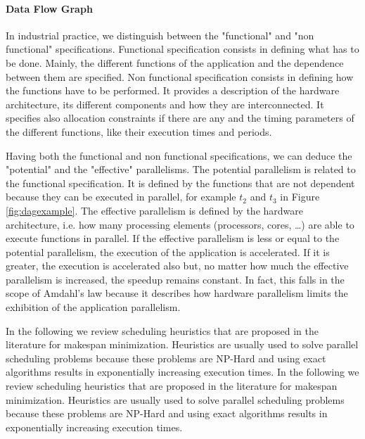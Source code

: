 \paragraph{Data Flow Graph}

In industrial practice, we distinguish between the "functional" and "non functional" specifications. Functional specification consists in defining what has to be done. Mainly, the different functions of the application and the dependence between them are specified. Non functional specification consists in defining how the functions have to be performed. It provides a description of the hardware architecture, its different components and how they are interconnected. It specifies also allocation constraints if there are any and the timing parameters of the different functions, like their execution times and periods.

Having both the functional and non functional specifications, we can deduce the "potential" and the "effective" parallelisms. The potential parallelism is related to the functional specification. It is defined by the functions that are not dependent because they can be executed in parallel, for example $t_2$ and $t_3$ in Figure \ref{fig:dagexample}. The effective parallelism is defined by the hardware architecture, i.e. how many processing elements (processors, cores, \ldots) are able to execute functions in parallel. If the effective parallelism is less or equal to the potential parallelism, the execution of the application is accelerated. If it is greater, the execution is accelerated also but, no matter how much the effective parallelism is increased, the speedup remains constant. In fact, this falls in the scope of Amdahl's law because it describes how hardware parallelism limits the exhibition of the application parallelism.

In the following we review scheduling heuristics that are proposed in the literature for makespan minimization. Heuristics are usually used to solve parallel scheduling problems because these problems are NP-Hard and using exact algorithms results in exponentially increasing execution times.  
In the following we review scheduling heuristics that are proposed in the literature for makespan minimization. Heuristics are usually used to solve parallel scheduling problems because these problems are NP-Hard and using exact algorithms results in exponentially increasing execution times.  

